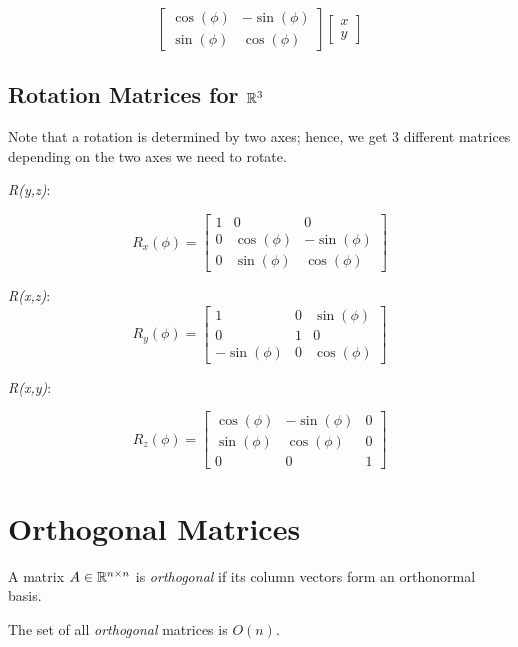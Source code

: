 \[
    \begin{bmatrix}
        \cos(\phi) & -\sin(\phi)\\
        \sin(\phi) & \cos(\phi)
    \end{bmatrix}
    \begin{bmatrix}
        x\\
        y
    \end{bmatrix}
\]

\QED

\subsection{Rotation Matrices for \texorpdfstring{\(\mathbb{R}^3\)}{}}

Note that a rotation is determined by two axes; hence, we get 3 different matrices depending on the two axes we need to rotate.

\emph{R(y,z)}:

\[
    R_x (\phi) =
    \begin{bmatrix}
        1 & 0 & 0 \\
        0 & \cos(\phi) & -\sin(\phi) \\
        0 & \sin(\phi) & \cos(\phi)
    \end{bmatrix}
\]

\emph{R(x,z)}:
\[
    R_y (\phi) =
    \begin{bmatrix}
        1 & 0 & \sin(\phi) \\
        0 & 1 & 0 \\
        -\sin(\phi) & 0 & \cos(\phi)
    \end{bmatrix}
\]

\emph{R(x,y)}:

\[
    R_z (\phi) =
    \begin{bmatrix}
        \cos(\phi) & -\sin(\phi) & 0 \\
        \sin(\phi) & \cos(\phi) & 0 \\
        0 & 0 & 1
    \end{bmatrix}
\]

\section{Orthogonal Matrices}

A matrix \(A \in \mathbb{R}^{n \times n}\) is \emph{orthogonal} if its column vectors form an orthonormal 
basis.

The set of all \emph{orthogonal} matrices is \(O(n)\).

